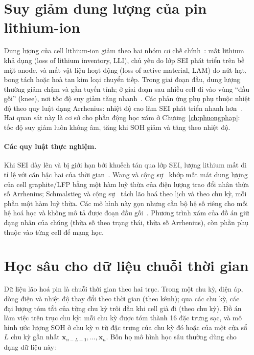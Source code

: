 \documentclass[12pt,a4paper,oneside]{report}
\theoremstyle{plain}
\theoremstyle{definition}
\begin{document}
\section{Suy giảm dung lượng của pin lithium-ion}

Dung lượng của cell lithium-ion giảm theo hai nhóm cơ chế chính~\cite{birkl2017}: mất lithium khả dụng (loss
of lithium inventory, LLI), chủ yếu do lớp SEI phát triển trên bề mặt anode, và mất vật liệu hoạt động (loss
of active material, LAM) do nứt hạt, bong tách hoặc hoà tan kim loại chuyển tiếp. Trong giai đoạn đầu, dung
lượng thường giảm chậm và gần tuyến tính; ở giai đoạn sau nhiều cell đi vào vùng “đầu gối” (knee), nơi
tốc độ suy giảm tăng nhanh~\cite{attia2022knee}. Các phản ứng phụ phụ thuộc nhiệt độ theo quy luật dạng
Arrhenius: nhiệt độ cao làm SEI phát triển nhanh hơn~\cite{waldmann2014}. Hai quan sát này là cơ sở cho
phần động học xám ở Chương~\ref{ch:phuongphap}: tốc độ suy giảm luôn không âm, tăng khi SOH giảm và tăng theo
nhiệt độ.

\paragraph{Các quy luật thực nghiệm.} Khi SEI dày lên và bị giới hạn bởi khuếch tán qua lớp SEI, lượng lithium
mất đi tỉ lệ với căn bậc hai của thời gian~\cite{broussely2001,pinson2013}. Wang và cộng sự~\cite{wang2011lfp} khớp
mất mát dung lượng của cell graphite/LFP bằng một hàm luỹ thừa của điện lượng trao đổi nhân thừa số Arrhenius;
Schmalstieg và cộng sự~\cite{schmalstieg2014} tách lão hoá theo lịch và theo chu kỳ, mỗi phần một hàm luỹ thừa.
Các mô hình này gọn nhưng cần bộ hệ số riêng cho mỗi hệ hoá học và không mô tả được đoạn đầu gối~\cite{fermin2020}.
Phương trình xám của đồ án giữ dạng nhân của chúng (thừa số theo trạng thái, thừa số Arrhenius), còn phần phụ thuộc
vào từng cell để mạng học.

\section{Học sâu cho dữ liệu chuỗi thời gian}\label{sec:ts}

Dữ liệu lão hoá pin là chuỗi thời gian theo hai trục. Trong một chu kỳ, điện áp, dòng điện và nhiệt độ thay đổi theo
thời gian (theo kênh); qua các chu kỳ, các đại lượng tóm tắt của từng chu kỳ trôi dần khi cell già đi (theo chu kỳ).
Đồ án làm việc trên trục chu kỳ: mỗi chu kỳ được tóm thành 16 đặc trưng sạc, và mô hình ước lượng SOH ở chu kỳ $n$
từ đặc trưng của chu kỳ đó hoặc của một cửa sổ $L$ chu kỳ gần nhất $\mathbf{x}_{n-L+1}, \dots, \mathbf{x}_n$. Bốn họ
mô hình học sâu thường dùng cho dạng dữ liệu này:
\end{document}

